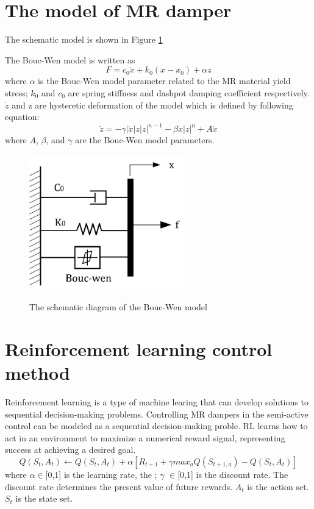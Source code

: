 \section{The model of MR damper}


The schematic model is shown in Figure \ref{bouc-wen}

The Bouc-Wen model is written as 
\begin{equation}F=c_0 \dot{x}+k_0(x-x_0)+\alpha z\end{equation}
where $\alpha$ is the Bouc-Wen model parameter related to the MR material yield stress; $k_0$ and $c_0$ are spring stiffness and dashpot damping coefficient respectively. $\dot{z}$ and z are hysteretic deformation of the model which is defined by following equation:
\begin{equation}\dot{z}=-\gamma|\dot{x}|z|z|^{n-1}-\beta \dot{x}|z|^n+A\dot{x}\end{equation}
where $A$, $\beta$, and $\gamma$ are the Bouc-Wen model parameters.

\begin{figure}[!h]
\centering
{\includegraphics[width=0.6\textwidth]{bouc-wen.jpg}} 
\caption{The schematic diagram of the Bouc-Wen model} 
\label{bouc-wen} 
\end{figure} 

\section{Reinforcement learning control method}

Reinforcement learning is a type of machine learing that can develop solutions to sequential decision-making problems. Controlling MR dampers in the semi-active control can be modeled as a sequential decision-making proble. RL learns how to act in an environment to maximize a numerical reward signal, representing success at achieving a desired goal. 
\begin{equation}Q(S_t,A_t) \leftarrow Q(S_t,A_t)+\alpha [R_{t+1} + \gamma max_{a}Q(S_{t+1,a})-Q(S_t,A_t)]\end{equation}
where $\alpha \in$[0,1] is the learning rate, the ; $\gamma$ $\in$[0,1] is the discount rate. The discount rate determines the present value of future rewards. $A_t$ is the action set. $S_t$ is the state set.

